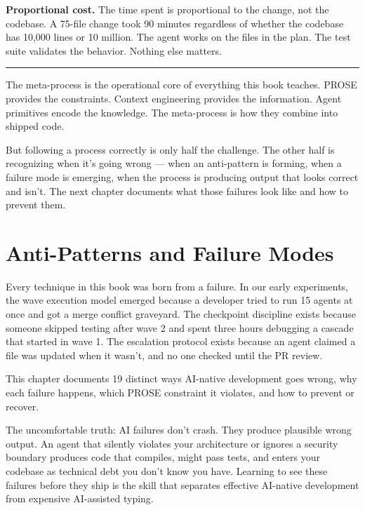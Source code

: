\documentclass[
  a4paper,
  DIV=11,
  numbers=noendperiod]{scrreprt}
\begin{document}
\textbf{Proportional cost.} The time spent is proportional to the
change, not the codebase. A 75-file change took 90 minutes regardless of
whether the codebase has 10,000 lines or 10 million. The agent works on
the files in the plan. The test suite validates the behavior. Nothing
else matters.

\begin{center}\rule{0.5\linewidth}{0.5pt}\end{center}

The meta-process is the operational core of everything this book
teaches. PROSE provides the constraints. Context engineering provides
the information. Agent primitives encode the knowledge. The meta-process
is how they combine into shipped code.

But following a process correctly is only half the challenge. The other
half is recognizing when it's going wrong --- when an anti-pattern is
forming, when a failure mode is emerging, when the process is producing
output that looks correct and isn't. The next chapter documents what
those failures look like and how to prevent them.

\chapter{Anti-Patterns and Failure
Modes}\label{anti-patterns-and-failure-modes}

Every technique in this book was born from a failure. In our early
experiments, the wave execution model emerged because a developer tried
to run 15 agents at once and got a merge conflict graveyard. The
checkpoint discipline exists because someone skipped testing after wave
2 and spent three hours debugging a cascade that started in wave 1. The
escalation protocol exists because an agent claimed a file was updated
when it wasn't, and no one checked until the PR review.

This chapter documents 19 distinct ways AI-native development goes
wrong, why each failure happens, which PROSE constraint it violates, and
how to prevent or recover.

The uncomfortable truth: AI failures don't crash. They produce plausible
wrong output. An agent that silently violates your architecture or
ignores a security boundary produces code that compiles, might pass
tests, and enters your codebase as technical debt you don't know you
have. Learning to see these failures before they ship is the skill that
separates effective AI-native development from expensive AI-assisted
typing.
\end{document}
